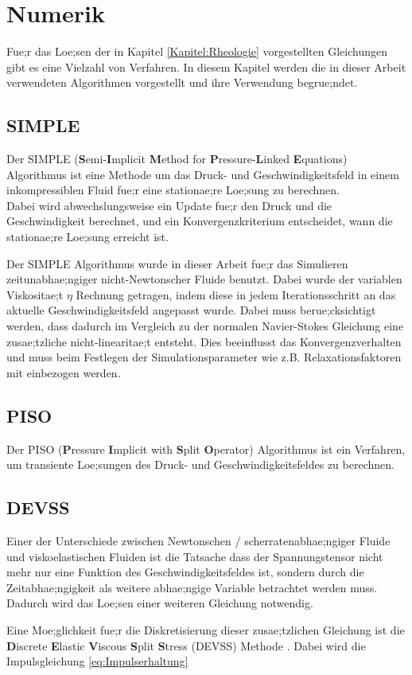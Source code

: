 \section{Numerik}
\label{Kapitel:Numerik}
Fue;r das Loe;sen der in Kapitel \ref{Kapitel:Rheologie} vorgestellten Gleichungen gibt es eine Vielzahl von Verfahren. In diesem Kapitel werden die in dieser Arbeit verwendeten Algorithmen vorgestellt und ihre Verwendung begrue;ndet.

\subsection{SIMPLE}
Der SIMPLE (\textbf{S}emi-\textbf{I}mplicit \textbf{M}ethod for \textbf{P}ressure-\textbf{L}inked \textbf{E}quations) Algorithmus  ist eine Methode um das Druck- und Geschwindigkeitsfeld in einem inkompressiblen Fluid fue;r eine stationae;re Loe;sung zu berechnen.\\
Dabei wird abwechslungsweise ein Update fue;r den Druck und die Geschwindigkeit berechnet, und ein Konvergenzkriterium entscheidet, wann die stationae;re Loe;sung erreicht ist.

Der SIMPLE Algorithmus wurde in dieser Arbeit fue;r das Simulieren zeitunabhae;ngiger nicht-Newtonscher Fluide benutzt. Dabei wurde der variablen Viskositae;t $\eta$ Rechnung getragen, indem diese in jedem Iterationsschritt an das aktuelle Geschwindigkeitsfeld angepasst wurde. Dabei muss berue;cksichtigt werden, dass dadurch im Vergleich zu der normalen Navier-Stokes Gleichung eine zusae;tzliche nicht-linearitae;t entsteht. Dies beeinflusst das Konvergenzverhalten und muss beim Festlegen der Simulationsparameter wie z.B. Relaxationsfaktoren mit einbezogen werden.

\subsection{PISO}
Der PISO (\textbf{P}ressure \textbf{I}mplicit with \textbf{S}plit \textbf{O}perator) Algorithmus ist ein Verfahren, um transiente Loe;sungen des Druck- und Geschwindigkeitsfeldes zu berechnen.

\subsection{DEVSS}
Einer der Unterschiede zwischen Newtonschen / scherratenabhae;ngiger Fluide  und viskoelastischen Fluiden ist die Tatsache dass der Spannungstensor nicht mehr nur eine Funktion des Geschwindigkeitsfeldes ist, sondern durch die Zeitabhae;ngigkeit als weitere abhae;ngige Variable betrachtet werden muss. Dadurch wird das Loe;sen einer weiteren Gleichung notwendig.

Eine Moe;glichkeit fue;r die Diskretisierung dieser zusae;tzlichen Gleichung ist die \textbf{D}iscrete \textbf{E}lastic \textbf{V}iscous \textbf{S}plit \textbf{S}tress (DEVSS) Methode \cite{devss}.
Dabei wird die Impulsgleichung \eqref{eq:Impulserhaltung} 
